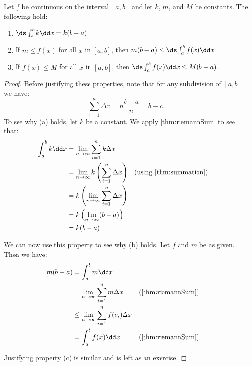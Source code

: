 \begin{theorem}\label{thm:further_def_int_props}
Let $f$ be continuous on the interval $[a,b]$ and let $k$, $m$, and $M$ be constants. The following hold:
\begin{enumerate}
\item $\ds\int_a^b k\dd x=k(b-a)$.
\item If $m\leq f(x)$ for all $x$ in $[a,b]$, then $m(b-a)\leq \ds\int_a^b f(x)\dd x$.
\item If $f(x)\leq M$ for all $x$ in $[a,b]$, then $\ds\int_a^b f(x)\dd x\leq M(b-a)$.
\end{enumerate}
\end{theorem}

\begin{proof}
Before justifying these properties, note that for any subdivision of $[a,b]$ we have: \[\sum_{i=1}^n \Delta x=n\frac{b-a}n=b-a.\]
To see why (a) holds, let $k$ be a constant. We apply \autoref{thm:riemannSum} to see that:
\begin{align*}
\int_a^b k\dd x &=\lim_{n\to\infty}\sum_{i=1}^n k\Delta x\\
&=\lim_{n\to\infty}k\left( \sum_{i=1}^n \Delta x\right)
&&\text{(using \autoref{thm:summation})}\\
&=k\left(\lim_{n\to\infty}\sum_{i=1}^n \Delta x\right)\\
&=k\left( \lim_{n\to\infty} (b-a)\right)\\
&=k(b-a)
\end{align*}

We can now use this property to see why (b) holds. Let $f$ and $m$ be as given. Then we have:
\begin{align*}
m(b-a)&=\int_a^b m\dd x \\
&=\lim_{n\to\infty}\sum_{i=1}^n m\Delta x
&&\text{(\autoref{thm:riemannSum})}\\
&\leq \lim_{n\to\infty}\sum_{i=1}^n f(c_i)\Delta x\\
&=\int_a^b f(x)\dd x &&\text{(\autoref{thm:riemannSum})}
\end{align*}

Justifying property (c) is similar and is left as an exercise.
\end{proof}


